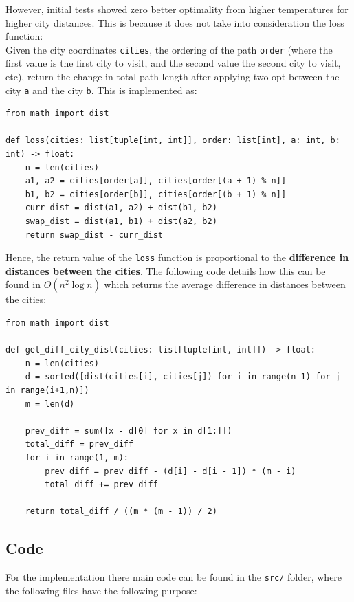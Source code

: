 \documentclass{article}
\begin{document}
However, initial tests showed zero better optimality from higher temperatures for higher city distances.
This is because it does not take into consideration the loss function: 
\\
Given the city coordinates \texttt{cities}, the ordering of the path \texttt{order} (where the first value is the first city to visit, and the second value the second city to visit, etc), return the change in total path length after applying two-opt between the city \texttt{a} and the city \texttt{b}.
This is implemented as:

\begin{verbatim}
from math import dist

def loss(cities: list[tuple[int, int]], order: list[int], a: int, b: int) -> float:
    n = len(cities)
    a1, a2 = cities[order[a]], cities[order[(a + 1) % n]]
    b1, b2 = cities[order[b]], cities[order[(b + 1) % n]]
    curr_dist = dist(a1, a2) + dist(b1, b2)
    swap_dist = dist(a1, b1) + dist(a2, b2)
    return swap_dist - curr_dist
\end{verbatim}

Hence, the return value of the \texttt{loss} function is proportional to the \textbf{difference in distances between the cities}.
The following code details how this can be found in $O(n^2 \log n)$ which returns the average difference in distances between the cities:

\begin{verbatim}
from math import dist

def get_diff_city_dist(cities: list[tuple[int, int]]) -> float:
    n = len(cities)
    d = sorted([dist(cities[i], cities[j]) for i in range(n-1) for j in range(i+1,n)])
    m = len(d)
    
    prev_diff = sum([x - d[0] for x in d[1:]])
    total_diff = prev_diff
    for i in range(1, m):
        prev_diff = prev_diff - (d[i] - d[i - 1]) * (m - i)
        total_diff += prev_diff
    
    return total_diff / ((m * (m - 1)) / 2)
\end{verbatim}

\newpage
\subsection{Code}

For the implementation there main code can be found in the \texttt{src/} folder, where the following files have the following purpose:
\end{document}
